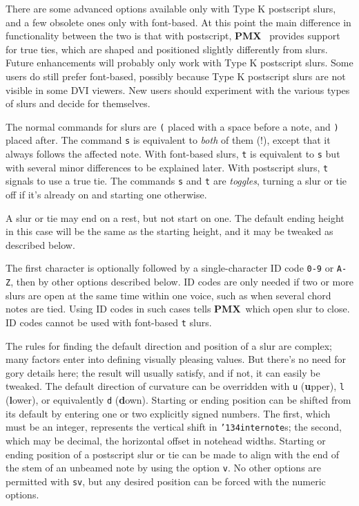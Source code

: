 \documentclass[11pt]{article}
\def\bs{{\tt\char'134}}
\newcommand\PMXX{\textbf{PMX}}
\newcommand\PMX{\PMXX~}
\def\newfrom{2.59}  %
\def\NEW#1{\ifdim#1 pt<\newfrom pt\else%
\marginpar{\fbox{#1}}\fi}
\begin{document}
There are some advanced options available only
with Type K postscript slurs, and a few obsolete ones only with font-based.
At this point the main
difference in functionality between the two is that with postscript, \PMX
provides support for 
true ties, which are shaped and positioned slightly differently from
slurs.  Future enhancements
will probably only work with Type K postscript slurs. Some users do still 
prefer
font-based, possibly because Type K postscript slurs are not visible in some 
DVI viewers. 
New users should experiment with the various types of slurs and decide for
themselves.

	The normal commands for slurs are {\tt (} placed with a space 
before a note, and {\tt )} placed after.  The command {\tt s} is equivalent to
{\it both} of them (!), except that it always follows the affected note.
With font-based slurs, {\tt t} is equivalent to {\tt s} but 
with several minor differences to be explained later. With postscript slurs,
{\tt t} signals to use a true tie.
The commands {\tt s} and {\tt t} are {\it toggles}, turning
a slur or tie off if it's already on and starting one otherwise.

A \NEW{2.5} slur or tie may end on a rest, but not start on one. The default 
ending height in this case will be the same as the starting height, and it 
may be tweaked as described below.

   The first character is optionally followed by
a single-character ID code {\tt 0-9} or {\tt A-Z}, then by other
options described below.  ID codes are only needed if two or more slurs are 
open at the same time within one voice, such as when several chord 
notes are tied.  Using ID codes in such cases tells \PMX which open slur to
close. ID codes cannot be used with font-based {\tt t} slurs. 
 
The rules for finding the default direction and position of a slur
are complex; many factors enter into defining visually pleasing values.  But 
there's no need for gory details here; the result will usually satisfy, and if 
not, it can easily be tweaked.  The default direction of curvature can be 
overridden with {\tt u} ({\bf u}pper), {\tt l} ({\bf l}ower),
or equivalently {\tt d} ({\bf d}own).  
Starting or ending position can be shifted from its default by
entering one or two explicitly signed numbers.  The first, which must be
an integer, represents the vertical shift in \bs{\tt internote}s; the second,  
which may be decimal, the horizontal offset in notehead widths. \NEW{2.71}Starting 
or ending
position of a postscript slur or tie can be made to align with the end of the stem 
of an unbeamed note by using the option {\tt v}. No other options are permitted
with {\tt sv}, but any desired position can be forced with the numeric options.
\end{document}
